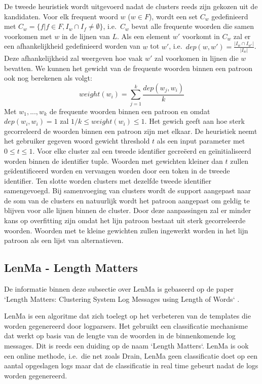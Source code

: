 \begin{itemize}
    \subitem De tweede heuristiek wordt uitgevoerd nadat de clusters reeds zijn gekozen uit de kandidaten. Voor elk frequent woord $w$ (\(w \in F\)), wordt een set \(C_{w}\) gedefinieerd met \(C_{w} = \{f \vert f \in F, I_{w} \cap I_{f} \neq \emptyset\}\), i.e.\ \(C_{w}\) bevat alle frequente woorden die samen voorkomen met $w$ in de lijnen van $L$. Als een element $w'$ voorkomt in \(C_{w}\) zal er een afhankelijkheid gedefinieerd worden van $w$ tot $w'$, i.e.\ \(dep(w, w') = \frac{\lvert I_{w} \cap I_{w'} \rvert}{\lvert I_{w} \rvert}\). Deze afhankelijkheid zal weergeven hoe vaak $w'$ zal voorkomen in lijnen die $w$ bevatten. We kunnen het gewicht van de frequente woorden binnen een patroon ook nog berekenen als volgt:
    \[weight(w_{i}) = \sum_{j=1}^{k} \frac {dep(w_{j}, w_{i})}{k}\]
    Met \(w_{1}, ..., w_{k}\) de frequente woorden binnen een patroon en omdat \(dep(w_{i}, w_{i}) = 1\) zal \(1/k \leq weight(w_{i}) \leq 1\). Het gewich geeft aan hoe sterk gecorreleerd de woorden binnen een patroon zijn met elkaar. De heuristiek neemt het gebruiker gegeven woord gewicht threshold $t$ als een input parameter met \(0 \le t \leq 1\). Voor elke cluster zal een tweede identifier gecreëerd en geïnitialiseerd worden binnen de identifier tuple. Woorden met gewichten kleiner dan $t$ zullen geïdentificeerd worden en vervangen worden door een token in de tweede identifier. Ten slotte worden clusters met dezelfde tweede identifier samengevoegd. Bij samenvoeging van clusters wordt de support aangepast naar de som van de clusters en natuurlijk wordt het patroon aangepast om geldig te blijven voor alle lijnen binnen de cluster. Door deze aanpassingen zal er minder kans op overfitting zijn omdat het lijn patroon bestaat uit sterk gecorreleerde woorden. Woorden met te kleine gewichten zullen ingewerkt worden in het lijn patroon als een lijst van alternatieven.
\end{itemize}

\subsection{LenMa - Length Matters}
De informatie binnen deze subsectie over LenMa is gebaseerd op de paper `Length Matters: Clustering System Log Messages using Length of Words` \autocite{shima2016length}.

LenMa is een algoritme dat zich toelegt op het verbeteren van de templates die worden gegenereerd door logparsers. Het gebruikt een classificatie mechanisme dat werkt op basis van de lengte van de woorden in de binnenkomende log messages. Dit is reeds een duiding op de naam `Length Matters`. LenMa is ook een online methode, i.e.\ die net zoals Drain, LenMa geen classificatie doet op een aantal opgeslagen logs maar dat de classificatie in real time gebeurt nadat de logs worden gegenereerd. 

